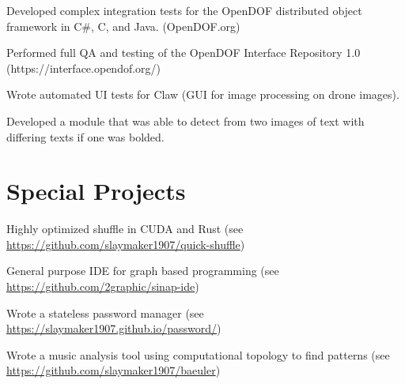 \documentclass[letterpaper]{deedy-resume} %
\begin{document}
\begin{minipage}[t]{0.64\textwidth}

\vspace{\topsep} %
\begin{tightitemize}
\item Developed complex integration tests for the OpenDOF distributed object framework in C\#, C, and Java. (OpenDOF.org)
\item Performed full QA and testing of the OpenDOF Interface Repository 1.0 (https://interface.opendof.org/)
\end{tightitemize}

\sectionspace



\begin{tightitemize}
\item Wrote automated UI tests for Claw (GUI for image processing on drone images).
\item Developed a module that was able to detect from two images of text with differing texts if one was bolded.
\end{tightitemize}

\sectionspace %



\section{Special Projects}
\vspace{\topsep} %
\begin{tightitemize}
\item Highly optimized shuffle in CUDA and Rust (see \url{https://github.com/slaymaker1907/quick-shuffle})
\item General purpose IDE for graph based programming (see \url{https://github.com/2graphic/sinap-ide})
\item Wrote a stateless password manager (see \url{https://slaymaker1907.github.io/password/})
\item Wrote a music analysis tool using computational topology to find patterns (see \url{https://github.com/slaymaker1907/baeuler})
\end{tightitemize}
\sectionspace %



\end{minipage} %
\end{document}
